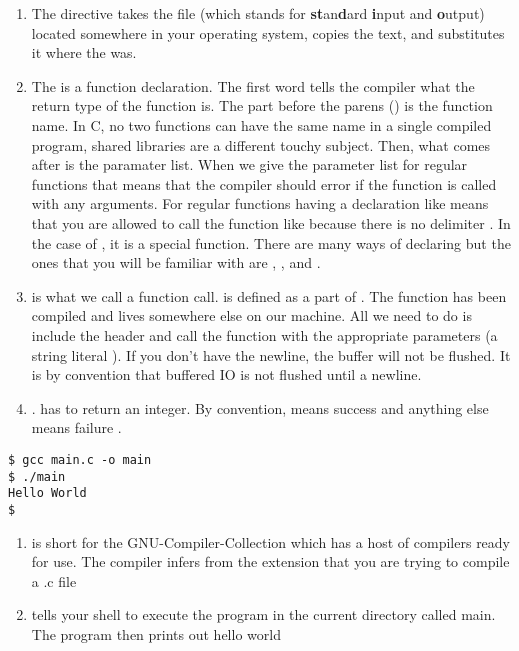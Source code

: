 \begin{enumerate}
  \item The  directive takes the file  (which stands for \textbf{st}an\textbf{d}ard \textbf{i}nput and \textbf{o}utput) located somewhere in your operating system, copies the text, and substitutes it where the  was.
  \item The  is a function declaration. The first word  tells the compiler what the return type of the function is. The part before the parens () is the function name. In C, no two functions can have the same name in a single compiled program, shared libraries are a different touchy subject. Then, what comes after is the paramater list. When we give the parameter list for regular functions  that means that the compiler should error if the function is called with any arguments. For regular functions having a declaration like  means that you are allowed to call the function like  because there is no delimiter \cite{CITATION_NEEDED}. In the case of , it is a special function. There are many ways of declaring  but the ones that you will be familiar with are , , and .
  \item {} is what we call a function call.  is defined as a part of . The function has been compiled and lives somewhere else on our machine. All we need to do is include the header and call the function with the appropriate parameters (a string literal ). If you don't have the newline, the buffer will not be flushed. It is by convention that buffered IO is not flushed until a newline. \cite{CITATION_NEEDED}
  \item {}.  has to return an integer. By convention,  means success and anything else means failure \cite{CITATION_NEEDED}.
\end{enumerate}

\begin{lstlisting}
$ gcc main.c -o main
$ ./main
Hello World
$
\end{lstlisting}

\begin{enumerate}
\item {} is short for the GNU-Compiler-Collection which has a host of compilers ready for use. The compiler infers from the extension that you are trying to compile a .c file
\item {} tells your shell to execute the program in the current directory called main. The program then prints out hello world
\end{enumerate}

